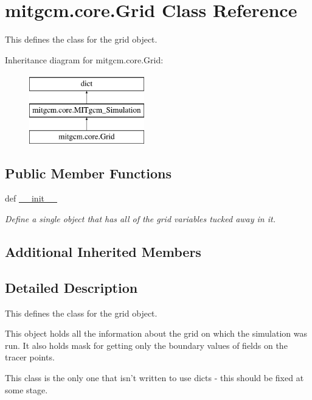 \hypertarget{classmitgcm_1_1core_1_1Grid}{\section{mitgcm.\+core.\+Grid Class Reference}
\label{classmitgcm_1_1core_1_1Grid}
}


This defines the class for the grid object.  


Inheritance diagram for mitgcm.\+core.\+Grid\+:\begin{figure}[H]
\begin{center}
\leavevmode
\includegraphics[height=3.000000cm]{classmitgcm_1_1core_1_1Grid}
\end{center}
\end{figure}
\subsection*{Public Member Functions}
\begin{DoxyCompactItemize}
\item 
def \hyperlink{classmitgcm_1_1core_1_1Grid_a8697cc503024a546e189c2707c56c0db}{\+\_\+\+\_\+init\+\_\+\+\_\+}
\begin{DoxyCompactList}\small\item\em Define a single object that has all of the grid variables tucked away in it. \end{DoxyCompactList}\end{DoxyCompactItemize}
\subsection*{Additional Inherited Members}


\subsection{Detailed Description}
This defines the class for the grid object. 

This object holds all the information about the grid on which the simulation was run. It also holds mask for getting only the boundary values of fields on the tracer points. \begin{DoxyVerb}This class is the only one that isn't written to use dicts - this should be fixed at some stage. \end{DoxyVerb}
 

